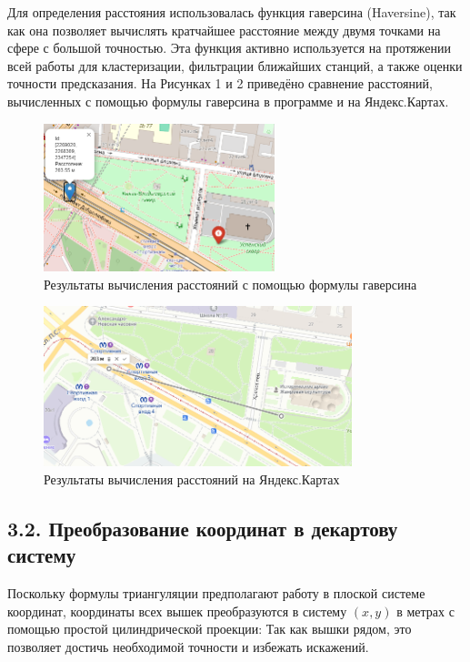 \documentclass[a4paper,14pt]{extarticle}
\begin{document}
\begin{itemize}
    Для определения расстояния использовалась функция гаверсина (Haversine), так как она позволяет вычислять кратчайшее расстояние между двумя точками на сфере с большой точностью.
    Эта функция активно используется на протяжении всей работы для кластеризации, фильтрации ближайших станций,
    а также оценки точности предсказания.
    На Рисунках 1 и 2 приведёно сравнение расстояний, вычисленных с помощью формулы гаверсина в программе и на Яндекс.Картах.
    \begin{figure}[H]
        \centering
        \includegraphics[width=0.6\textwidth]{haversine.png}
        \caption{Результаты вычисления расстояний с помощью формулы гаверсина}
        \label{fig:haversine_vs_yandex}
    \end{figure}
    \begin{figure}[H]
        \centering
        \includegraphics[width=0.8\textwidth]{yandex.png}
        \caption{Результаты вычисления расстояний на Яндекс.Картах}
        \label{fig:yandex_vs_haversine}
    \end{figure}

    \subsection*{3.2. Преобразование координат в декартову систему}

    Поскольку формулы триангуляции предполагают работу в плоской системе координат,
    координаты всех вышек преобразуются в систему \((x, y)\) в метрах с помощью простой цилиндрической проекции:
    Так как вышки рядом, это позволяет достичь необходимой точности и избежать искажений.


\end{itemize}
\end{document}
